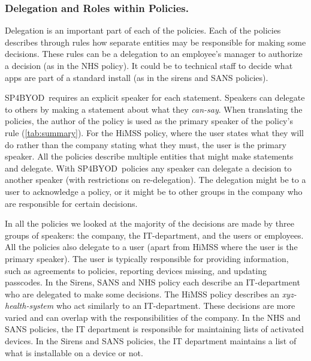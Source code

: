 \documentclass{llncs}
\newcommand{\AppPAL}[0]{SP4BYOD}
\begin{document}
\subsubsection{Delegation and Roles within Policies.}

Delegation is an important part of each of the policies.
Each of the policies describes through rules how separate entities may be responsible for making some decisions.
These rules can be a delegation to an employee's manager to authorize a decision (as in the NHS policy). 
It could be to technical staff to decide what apps are part of a standard install (as in the sirens and SANS policies).

\AppPAL~requires an explicit speaker for each statement.
Speakers can delegate to others by making a statement about what they \emph{can-say}.
When translating the policies, the author of the policy is used as the primary speaker of the policy's rule (\autoref{tab:summary}).
For the \ac{HiMSS} policy, where the user states what they will do rather than the company stating what they must, the user is the primary speaker.
All the policies describe multiple entities that might make statements and delegate.
With \AppPAL~policies any speaker can delegate a decision to another speaker (with restrictions on re-delegation).
The delegation might be to a user to acknowledge a policy, or it might be to other groups in the company who are responsible for certain decisions.

In all the policies we looked at the majority of the decisions are made by three groups of speakers: 
  the company, the IT-department, and the users or employees.
All the policies also delegate to a user (apart from \ac{HiMSS} where the user is the primary speaker).
The user is typically responsible for providing information, such as agreements to policies, reporting devices missing, and updating passcodes.
In the Sirens, SANS and NHS policy each describe an IT-department who are delegated to make some decisions.
The \ac{HiMSS} policy describes an \emph{xyz-health-system} who act similarly to an IT-department.
These decisions are more varied and can overlap with the responsibilities of the company.
In the NHS and SANS policies, the IT department is responsible for maintaining lists of activated devices.
In the Sirens and SANS policies, the IT department maintains a list of what is installable on a device or not.
\end{document}

